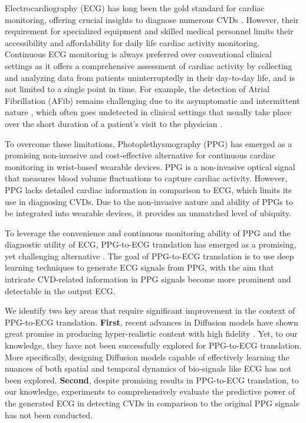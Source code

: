 \documentclass[letterpaper]{article} %
\begin{document}
Electrocardiography (ECG) has long been the gold standard for cardiac monitoring, offering crucial insights to diagnose numerous CVDs \cite{hannun2019cardiologist}. However, their requirement for specialized equipment and skilled medical personnel limits their accessibility and affordability for daily life cardiac activity monitoring. Continuous ECG monitoring is always preferred over conventional clinical settings as it offers a comprehensive assessment of cardiac activity by collecting and analyzing data from patients uninterruptedly in their day-to-day life, and is not limited to a single point in time. For example, the detection of Atrial Fibrillation (AFib) remains challenging due to its asymptomatic and intermittent nature \cite{camm2012usefulness}, which often goes undetected in clinical settings that usually take place over the short duration of a patient's visit to the physician \cite{steinhubl2018effect}.

To overcome these limitations, Photoplethysmography (PPG) has emerged as a promising non-invasive and cost-effective alternative for continuous cardiac monitoring in wrist-based wearable devices.
PPG is a non-invasive optical signal that measures blood volume fluctuations to capture cardiac activity. However, PPG lacks detailed cardiac information in comparison to ECG, which limits its use in diagnosing CVDs. Due to the non-invasive nature and ability of PPGs to be integrated into wearable devices, it provides an unmatched level of ubiquity.

To leverage the convenience and continuous monitoring ability of PPG and the diagnostic utility of ECG, PPG-to-ECG translation has emerged as a promising, yet challenging alternative \cite{sarkar2021cardiogan,vo2021p2e,lan2023performer}. The goal of PPG-to-ECG translation is to use deep learning techniques to generate ECG signals from PPG, with the aim that intricate %
CVD-related information in PPG signals become more prominent and detectable in the output ECG.


We identify two key areas that require significant improvement in the context of PPG-to-ECG translation.
\textbf{First}, recent advances in Diffusion models have shown great promise in producing hyper-realistic content with high fidelity \cite{saharia2022photorealistic, blattmann2023align, ruan2023mm}. Yet, to our knowledge, they have not been successfully explored for PPG-to-ECG translation. More specifically, designing Diffusion models capable of effectively learning the nuances of both spatial and temporal dynamics of bio-signals like ECG has not been explored.
\textbf{Second}, despite promising results in PPG-to-ECG translation, to our knowledge, experiments to comprehensively evaluate the predictive power of the generated ECG in detecting CVDs in comparison to the original PPG signals has not been conducted.
\end{document}
